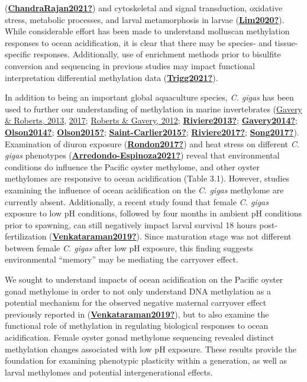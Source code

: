 \documentclass [11pt, proquest] {uwthesis}[2015/03/03]
\begin{document}
(\protect\hyperlink{ref-ChandraRajan2021}{\textbf{ChandraRajan2021?}}) and cytoskeletal and signal transduction, oxidative stress, metabolic processes, and larval metamorphosis in larvae (\protect\hyperlink{ref-Lim2020}{\textbf{Lim2020?}}). While considerable effort has been made to understand molluscan methylation responses to ocean acidification, it is clear that there may be species- and tissue-specific responses. Additionally, use of enrichment methods prior to bisulfite conversion and sequencing in previous studies may impact functional interpretation differential methylation data (\protect\hyperlink{ref-Trigg2021}{\textbf{Trigg2021?}}).

In addition to being an important global aquaculture species, \emph{C. gigas} has been used to further our understanding of methylation in marine invertebrates (\protect\hyperlink{ref-Gavery2013}{Gavery \& Roberts, 2013}, \protect\hyperlink{ref-Gavery2017}{2017}; \protect\hyperlink{ref-Roberts2012}{Roberts \& Gavery, 2012}; \protect\hyperlink{ref-Riviere2013}{\textbf{Riviere2013?}}; \protect\hyperlink{ref-Gavery2014}{\textbf{Gavery2014?}}; \protect\hyperlink{ref-Olson2014}{\textbf{Olson2014?}}; \protect\hyperlink{ref-Olson2015}{\textbf{Olson2015?}}; \protect\hyperlink{ref-Saint-Carlier2015}{\textbf{Saint-Carlier2015?}}; \protect\hyperlink{ref-Riviere2017}{\textbf{Riviere2017?}}; \protect\hyperlink{ref-Song2017}{\textbf{Song2017?}}). Examination of diuron exposure (\protect\hyperlink{ref-Rondon2017}{\textbf{Rondon2017?}}) and heat stress on different \emph{C. gigas} phenotypes (\protect\hyperlink{ref-Arredondo-Espinoza2021}{\textbf{Arredondo-Espinoza2021?}}) reveal that environmental conditions do influence the Pacific oyster methylome, and other oyster methylomes are responsive to ocean acidification (Table 3.1). However, studies examining the influence of ocean acidification on the \emph{C. gigas} methylome are currently absent. Additionally, a recent study found that female \emph{C. gigas} exposure to low pH conditions, followed by four months in ambient pH conditions prior to spawning, can still negatively impact larval survival 18 hours post-fertilization (\protect\hyperlink{ref-Venkataraman2019}{\textbf{Venkataraman2019?}}). Since maturation stage was not different between female \emph{C. gigas} after low pH exposure, this finding suggests environmental ``memory'' may be mediating the carryover effect.

We sought to understand impacts of ocean acidification on the Pacific oyster gonad methylome in order to not only understand DNA methylation as a potential mechanism for the observed negative maternal carryover effect previously reported in (\protect\hyperlink{ref-Venkataraman2019}{\textbf{Venkataraman2019?}}), but to also examine the functional role of methylation in regulating biological responses to ocean acidification. Female oyster gonad methylome sequencing revealed distinct methylation changes associated with low pH exposure. These results provide the foundation for examining phenotypic plasticity within a generation, as well as larval methylomes and potential intergenerational effects.
\end{document}
